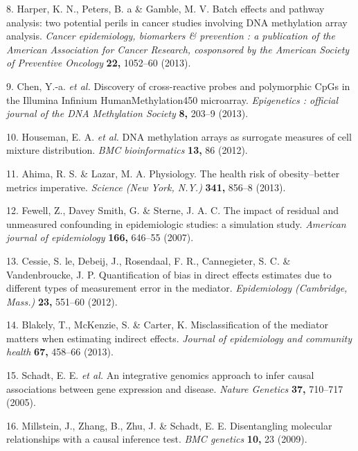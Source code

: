 \documentclass[]{article}
\begin{document}
\hypertarget{ref-Harper2013}{}
8. Harper, K. N., Peters, B. a \& Gamble, M. V. Batch effects and
pathway analysis: two potential perils in cancer studies involving DNA
methylation array analysis. \emph{Cancer epidemiology, biomarkers \&
prevention : a publication of the American Association for Cancer
Research, cosponsored by the American Society of Preventive Oncology}
\textbf{22,} 1052--60 (2013).

\hypertarget{ref-Chen2013a}{}
9. Chen, Y.-a. \emph{et al.} Discovery of cross-reactive probes and
polymorphic CpGs in the Illumina Infinium HumanMethylation450
microarray. \emph{Epigenetics : official journal of the DNA Methylation
Society} \textbf{8,} 203--9 (2013).

\hypertarget{ref-Houseman2012}{}
10. Houseman, E. A. \emph{et al.} DNA methylation arrays as surrogate
measures of cell mixture distribution. \emph{BMC bioinformatics}
\textbf{13,} 86 (2012).

\hypertarget{ref-Ahima2013}{}
11. Ahima, R. S. \& Lazar, M. A. Physiology. The health risk of
obesity--better metrics imperative. \emph{Science (New York, N.Y.)}
\textbf{341,} 856--8 (2013).

\hypertarget{ref-Fewell2007}{}
12. Fewell, Z., Davey Smith, G. \& Sterne, J. A. C. The impact of
residual and unmeasured confounding in epidemiologic studies: a
simulation study. \emph{American journal of epidemiology} \textbf{166,}
646--55 (2007).

\hypertarget{ref-LeCessie2012}{}
13. Cessie, S. le, Debeij, J., Rosendaal, F. R., Cannegieter, S. C. \&
Vandenbroucke, J. P. Quantification of bias in direct effects estimates
due to different types of measurement error in the mediator.
\emph{Epidemiology (Cambridge, Mass.)} \textbf{23,} 551--60 (2012).

\hypertarget{ref-Blakely2013}{}
14. Blakely, T., McKenzie, S. \& Carter, K. Misclassification of the
mediator matters when estimating indirect effects. \emph{Journal of
epidemiology and community health} \textbf{67,} 458--66 (2013).

\hypertarget{ref-Schadt2005}{}
15. Schadt, E. E. \emph{et al.} An integrative genomics approach to
infer causal associations between gene expression and disease.
\emph{Nature Genetics} \textbf{37,} 710--717 (2005).

\hypertarget{ref-Millstein2009}{}
16. Millstein, J., Zhang, B., Zhu, J. \& Schadt, E. E. Disentangling
molecular relationships with a causal inference test. \emph{BMC
genetics} \textbf{10,} 23 (2009).
\end{document}

